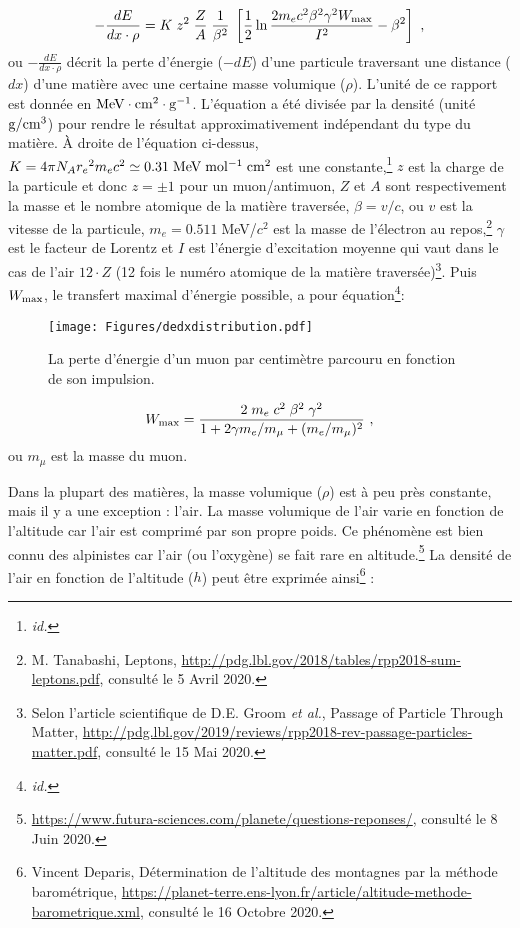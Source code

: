 \documentclass[a4paper, 12pt]{article}
\begin{document}
\begin{spacing}{1.5}
\begin{equation}
- \frac{dE}{dx\cdot\rho} = K\;z^2\;\frac{Z}{A}\;\frac{1}{\beta^2}\;\left[\frac{1}{2}\ln{\frac{2m_ec^2\beta^2\gamma^2W_{\rm max}}{I^2}} - \beta^2 \right]~, \label{eq:bethe}
\end{equation}
ou $-\frac{dE}{dx\cdot\rho}$ décrit la perte d'énergie ($-dE$) d'une particule traversant une distance ($dx$) d'une matière avec une certaine masse volumique ($\rho$). L'unité de ce rapport est donnée en ${\rm MeV\cdot cm^2\cdot g^{-1}}$. L'équation a été divisée par la densité (unité $\rm g/cm^3$) pour rendre le résultat approximativement indépendant du type du matière.
À droite de l'équation ci-dessus, $K = 4\pi  N_A{r_e}^2m_ec^2\simeq0.31\;{\rm MeV\;mol^{-1}\; cm^2}$  est une constante,\footnote{\emph{id.}} $z$ est la charge de la particule et donc $z=\pm1$ pour un muon/antimuon, $Z$ et $A$ sont respectivement la masse et le nombre atomique de la matière traversée, $\beta = v/c$, ou $v$ est la vitesse de la particule, $m_e=0.511\;$MeV/$c^2$ est la masse de l'électron au repos,\footnote{M. Tanabashi, Leptons, \url{http://pdg.lbl.gov/2018/tables/rpp2018-sum-leptons.pdf}, consulté le 5 Avril 2020.} $\gamma$ est le facteur de Lorentz et $I$ est l'énergie d'excitation moyenne qui vaut dans le cas de l'air $12\cdot Z$ (12 fois le numéro atomique de la matière traversée)\footnote{Selon l'article scientifique de D.E. Groom \emph{et al.}, Passage of Particle Through Matter, \url{http://pdg.lbl.gov/2019/reviews/rpp2018-rev-passage-particles-matter.pdf}, consulté le 15 Mai 2020.}. Puis $W_{\rm max}$, le transfert maximal d'énergie possible, a pour équation\footnote{\emph{id.}}:
\begin{figure}[t]
\begin{center}
  \texttt{[image: Figures/dedxdistribution.pdf]}
  \caption{\label{fig:dedxdistribution} La perte d'énergie d'un muon par centimètre parcouru en fonction de son impulsion.}
\end{center}
\end{figure}

\begin{equation}
W_{\rm max} = \frac{2\;m_e\;c^2\;\beta^2\;\gamma^2}{1 + 2\gamma m_e/m_\mu + (m_e/m_\mu)^2}~, \label{eq:wmax}
\end{equation}
ou $m_\mu$ est la masse du muon. 

Dans la plupart des matières, la masse volumique ($\rho$) est à peu près constante, mais il y a une exception : l'air. La masse volumique de l'air varie en fonction de l'altitude car l'air est comprimé par son propre poids. Ce phénomène est bien connu des alpinistes car l'air (ou l'oxygène) se fait rare en altitude.\footnote{\url{https://www.futura-sciences.com/planete/questions-reponses/}, consulté le 8 Juin 2020.} La densité de l'air en fonction de l'altitude ($h$) peut être exprimée ainsi\footnote{Vincent Deparis, Détermination de l'altitude des montagnes par la méthode barométrique, \url{https://planet-terre.ens-lyon.fr/article/altitude-methode-barometrique.xml}, consulté le 16 Octobre 2020.} :


\end{spacing}
\end{document}
